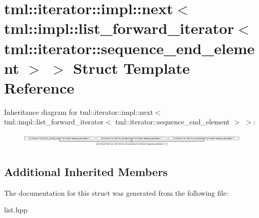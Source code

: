 \hypertarget{structtml_1_1iterator_1_1impl_1_1next_3_01tml_1_1impl_1_1list__forward__iterator_3_01tml_1_1iter83495844ec620c2857fd4fcff65c98c0}{\section{tml\+:\+:iterator\+:\+:impl\+:\+:next$<$ tml\+:\+:impl\+:\+:list\+\_\+forward\+\_\+iterator$<$ tml\+:\+:iterator\+:\+:sequence\+\_\+end\+\_\+element $>$ $>$ Struct Template Reference}
\label{structtml_1_1iterator_1_1impl_1_1next_3_01tml_1_1impl_1_1list__forward__iterator_3_01tml_1_1iter83495844ec620c2857fd4fcff65c98c0}
}
Inheritance diagram for tml\+:\+:iterator\+:\+:impl\+:\+:next$<$ tml\+:\+:impl\+:\+:list\+\_\+forward\+\_\+iterator$<$ tml\+:\+:iterator\+:\+:sequence\+\_\+end\+\_\+element $>$ $>$\+:\begin{figure}[H]
\begin{center}
\leavevmode
\includegraphics[height=0.682511cm]{structtml_1_1iterator_1_1impl_1_1next_3_01tml_1_1impl_1_1list__forward__iterator_3_01tml_1_1iter83495844ec620c2857fd4fcff65c98c0}
\end{center}
\end{figure}
\subsection*{Additional Inherited Members}


The documentation for this struct was generated from the following file\+:\begin{DoxyCompactItemize}
\item 
list.\+hpp\end{DoxyCompactItemize}
